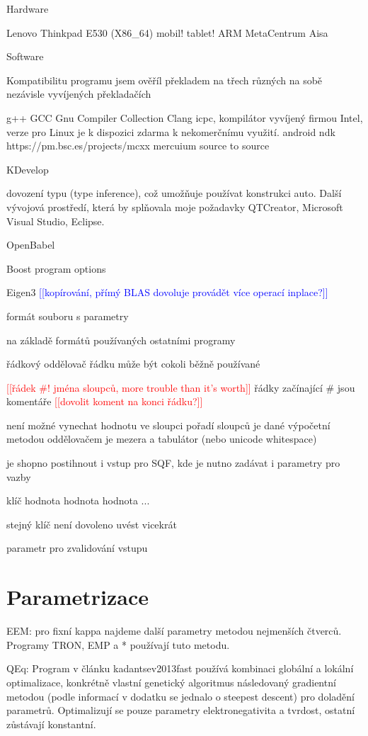 \documentclass[
  color, %
  table, %
  lof,   %
  lot,   %
]{fithesis3}
\newcommand\fixme[1]{\textcolor{red}{[[#1]]}}
\newcommand\todo[1]{\textcolor{blue}{[[#1]]}}
\begin{document}
Hardware

Lenovo Thinkpad E530 (X86\_64)
mobil! tablet! ARM
MetaCentrum
Aisa

Software

Kompatibilitu programu jsem ověříl překladem na třech různých na sobě nezávisle vyvíjených překladačích

g++ GCC Gnu Compiler Collection
Clang
icpc, kompilátor vyvíjený firmou Intel, verze pro Linux je k dispozici zdarma k nekomerčnímu využití.
android ndk
https://pm.bsc.es/projects/mcxx mercuium source to source

KDevelop

dovození typu (type inference), což umožňuje používat konstrukci auto. Další vývojová prostředí, která by splňovala moje požadavky QTCreator, Microsoft Visual Studio, Eclipse.

OpenBabel

Boost program options

Eigen3
\todo{kopírování, přímý BLAS dovoluje provádět více operací inplace?}

formát souboru s parametry

na základě formátů používaných ostatními programy

řádkový
oddělovač řádku může být cokoli běžně používané

\fixme{řádek #! jména sloupců, more trouble than it's worth}
řádky začínající # jsou komentáře \fixme{dovolit koment na konci řádku?}

není možné vynechat hodnotu ve sloupci
pořadí sloupců je dané výpočetní metodou
oddělovačem je mezera a tabulátor (nebo unicode whitespace)

je shopno postihnout i vstup pro SQF, kde je nutno zadávat i parametry pro vazby

klíč hodnota hodnota hodnota ...

stejný klíč není dovoleno uvést vicekrát

parametr pro zvalidování vstupu


\chapter{Parametrizace}

EEM: pro fixní kappa najdeme další parametry metodou nejmenších čtverců. Programy TRON, EMP a * používají tuto metodu.

QEq: Program v článku kadantsev2013fast používá kombinaci globální a lokální optimalizace, konkrétně vlastní genetický algoritmus následovaný gradientní metodou (podle informací v dodatku se jednalo o steepest descent) pro doladění parametrů. Optimalizují se pouze parametry elektronegativita a tvrdost, ostatní zůstávají konstantní.
\end{document}
